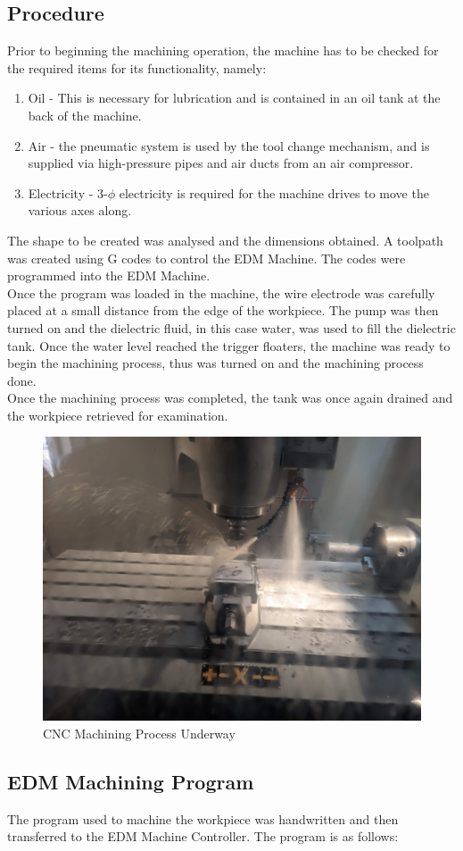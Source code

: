 \subsection{Procedure}
Prior to beginning the machining operation, the machine has to be checked for the required items for its functionality, namely:
\begin{enumerate}
	\item Oil - This is necessary for lubrication and is contained in an oil tank at the back of the machine.
	\item Air - the pneumatic system is used by the tool change mechanism, and is supplied via high-pressure pipes and air ducts from an air compressor.
	\item Electricity - 3-$\phi$ electricity is required for the machine drives to move the various axes along.
\end{enumerate}
The shape to be created was analysed and the dimensions obtained. A toolpath was created using G codes to control the EDM Machine. The codes were programmed into the EDM Machine.\\
Once the program was loaded in the machine, the wire electrode was carefully placed at a small distance from the edge of the workpiece. The pump was then turned on and the dielectric fluid, in this case water, was used to fill the dielectric tank. Once the water level reached the trigger floaters, the machine was ready to begin the machining process, thus was turned on and the machining process done.\\
Once the machining process was completed, the tank was once again drained and the workpiece retrieved for examination.
\begin{figure}[h!]
	\centering
	\includegraphics[width=0.7\linewidth]{Figures/machining}
	\caption[CNC Machining Process]{CNC Machining Process Underway}
	\label{fig:machining}
\end{figure}
\subsection{EDM Machining Program}
The program used to machine the workpiece was  handwritten and then transferred to the EDM Machine Controller. The program is as follows:
